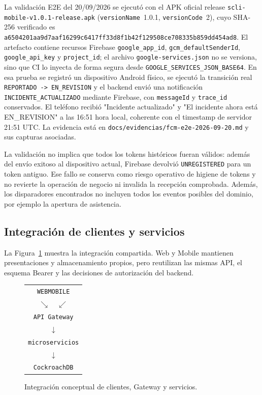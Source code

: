 La validación E2E del 20/09/2026 se ejecutó con el APK oficial release
\texttt{scli-mobile-v1.0.1-release.apk} (\texttt{versionName}~1.0.1,
\texttt{versionCode}~2), cuyo SHA-256 verificado es
\texttt{a6504201aa9d7aaf16299c6417ff33d8f1b42f129508ce708335b859dd454ad8}.
El artefacto contiene recursos Firebase
\texttt{google\_app\_id}, \texttt{gcm\_defaultSenderId},
\texttt{google\_api\_key} y \texttt{project\_id}; el archivo
\texttt{google-services.json} no se versiona, sino que CI lo inyecta de forma
segura desde \texttt{GOOGLE\_SERVICES\_JSON\_BASE64}. En esa prueba se registró
un dispositivo Android físico, se ejecutó la transición real
\texttt{REPORTADO -> EN\_REVISION} y el backend envió una notificación
\texttt{INCIDENTE\_ACTUALIZADO} mediante Firebase, con \texttt{messageId} y
\texttt{trace\_id} conservados. El teléfono recibió "Incidente actualizado" y
"El incidente ahora está EN\_REVISION" a las 16:51 hora local, coherente con el
timestamp de servidor 21:51 UTC. La evidencia está en
\texttt{docs/evidencias/fcm-e2e-2026-09-20.md} y sus capturas asociadas.

La validación no implica que todos los tokens históricos fueran válidos: además
del envío exitoso al dispositivo actual, Firebase devolvió \texttt{UNREGISTERED}
para un token antiguo. Ese fallo se conserva como riesgo operativo de higiene de
tokens y no revierte la operación de negocio ni invalida la recepción comprobada.
Además, los disparadores encontrados no incluyen todos los eventos posibles del
dominio, por ejemplo la apertura de asistencia.

\subsection{Integración de clientes y servicios}
\label{subsec:integracion-clientes}

La Figura~\ref{fig:integracion-clientes} muestra la integración compartida. Web
y Mobile mantienen presentaciones y almacenamiento propios, pero reutilizan las
mismas API, el esquema Bearer y las decisiones de autorización del backend.

\begin{figure}[ht]
  \centering
  \begin{tabular}{c}
    \texttt{WEB}\quad\texttt{MOBILE} \\
    $\searrow\quad\swarrow$ \\
    \texttt{API Gateway} \\
    $\downarrow$ \\
    \texttt{microservicios} \\
    $\downarrow$ \\
    \texttt{CockroachDB}
  \end{tabular}
  \caption{Integración conceptual de clientes, Gateway y servicios.}
  \label{fig:integracion-clientes}
\end{figure}

